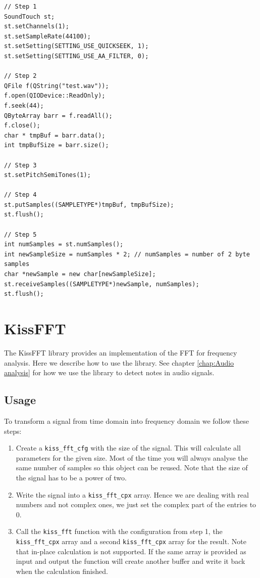 \begin{lstlisting}
// Step 1
SoundTouch st;
st.setChannels(1);
st.setSampleRate(44100);
st.setSetting(SETTING_USE_QUICKSEEK, 1);
st.setSetting(SETTING_USE_AA_FILTER, 0);

// Step 2
QFile f(QString("test.wav"));
f.open(QIODevice::ReadOnly);
f.seek(44);
QByteArray barr = f.readAll();
f.close();
char * tmpBuf = barr.data();
int tmpBufSize = barr.size();

// Step 3
st.setPitchSemiTones(1);

// Step 4
st.putSamples((SAMPLETYPE*)tmpBuf, tmpBufSize);
st.flush();

// Step 5
int numSamples = st.numSamples();
int newSampleSize = numSamples * 2; // numSamples = number of 2 byte samples
char *newSample = new char[newSampleSize];
st.receiveSamples((SAMPLETYPE*)newSample, numSamples);
st.flush();
\end{lstlisting}


\section[KissFFT \textsuperscript{Kugler}]{KissFFT}
\label{sec:KissFFT}
The KissFFT library provides an implementation of the \gls{FFT} for frequency analysis. Here we describe how to use the library. See chapter \ref{chap:Audio analysis} for how we use the library to detect notes in audio signals.

\subsection{Usage}
To transform a signal from time domain into frequency domain we follow these steps:
\begin{enumerate}
	\item Create a {\tt kiss\_fft\_cfg} with the size of the signal. This will calculate all parameters for the given size. Most of the time you will always analyse the same number of samples so this object can be reused. Note that the size of the signal has to be a power of two.
	\item Write the signal into a {\tt kiss\_fft\_cpx} array. Hence we are dealing with real numbers and not complex ones, we just set the complex part of the entries to 0.
	\item Call the {\tt kiss\_fft} function with the configuration from step 1, the {\tt kiss\_fft\_cpx} array and a second {\tt kiss\_fft\_cpx} array for the result. Note that in-place calculation is not supported. If the same array is provided as input and output the function will create another buffer and write it back when the calculation finished.
\end{enumerate}

